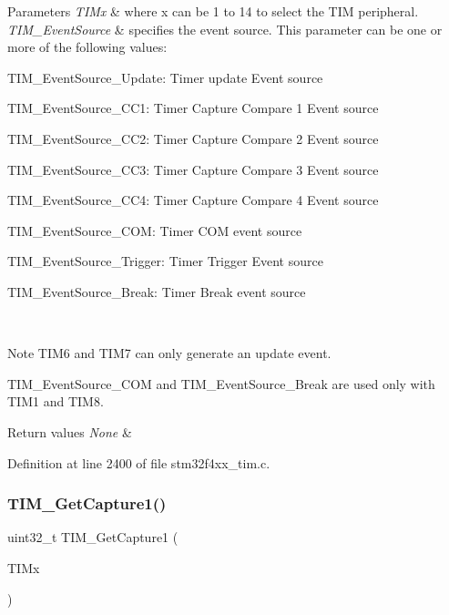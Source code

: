 \begin{DoxyParams}{Parameters}
{\em T\+I\+Mx} & where x can be 1 to 14 to select the T\+IM peripheral. \\
\hline
{\em T\+I\+M\+\_\+\+Event\+Source} & specifies the event source. This parameter can be one or more of the following values\+: \begin{DoxyItemize}
\item T\+I\+M\+\_\+\+Event\+Source\+\_\+\+Update\+: Timer update Event source \item T\+I\+M\+\_\+\+Event\+Source\+\_\+\+C\+C1\+: Timer Capture Compare 1 Event source \item T\+I\+M\+\_\+\+Event\+Source\+\_\+\+C\+C2\+: Timer Capture Compare 2 Event source \item T\+I\+M\+\_\+\+Event\+Source\+\_\+\+C\+C3\+: Timer Capture Compare 3 Event source \item T\+I\+M\+\_\+\+Event\+Source\+\_\+\+C\+C4\+: Timer Capture Compare 4 Event source \item T\+I\+M\+\_\+\+Event\+Source\+\_\+\+C\+OM\+: Timer C\+OM event source \item T\+I\+M\+\_\+\+Event\+Source\+\_\+\+Trigger\+: Timer Trigger Event source \item T\+I\+M\+\_\+\+Event\+Source\+\_\+\+Break\+: Timer Break event source\end{DoxyItemize}
\\
\hline
\end{DoxyParams}
\begin{DoxyNote}{Note}
T\+I\+M6 and T\+I\+M7 can only generate an update event. 

T\+I\+M\+\_\+\+Event\+Source\+\_\+\+C\+OM and T\+I\+M\+\_\+\+Event\+Source\+\_\+\+Break are used only with T\+I\+M1 and T\+I\+M8.
\end{DoxyNote}

\begin{DoxyRetVals}{Return values}
{\em None} & \\
\hline
\end{DoxyRetVals}


Definition at line 2400 of file stm32f4xx\+\_\+tim.\+c.

\mbox{\label{group___t_i_m_ga6bd39ca543305ff0cd06fce0f678d94d}} 
\subsubsection{\texorpdfstring{T\+I\+M\+\_\+\+Get\+Capture1()}{TIM\_GetCapture1()}}
{\footnotesize\ttfamily uint32\+\_\+t T\+I\+M\+\_\+\+Get\+Capture1 (\begin{DoxyParamCaption}\item[{\hyperlink{struct_t_i_m___type_def}{T\+I\+M\+\_\+\+Type\+Def} $\ast$}]{T\+I\+Mx }\end{DoxyParamCaption})}



